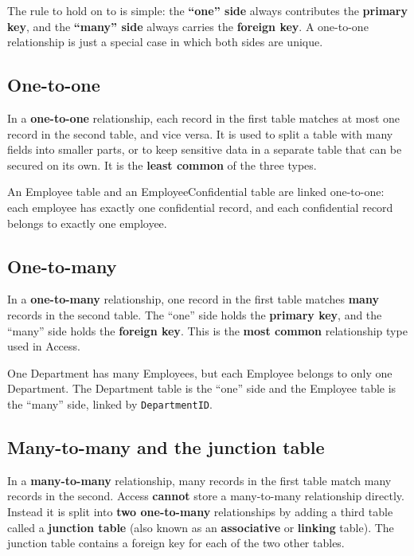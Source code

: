The rule to hold on to is simple: the \textbf{``one'' side} always contributes
the \textbf{primary key}, and the \textbf{``many'' side} always carries the
\textbf{foreign key}. A one-to-one relationship is just a special case in
which both sides are unique.

\subsection{One-to-one}
In a \textbf{one-to-one} relationship, each record in the first table matches
at most one record in the second table, and vice versa. It is used to split a
table with many fields into smaller parts, or to keep sensitive data in a
separate table that can be secured on its own. It is the \textbf{least common}
of the three types.

\begin{example}
An Employee table and an EmployeeConfidential table are linked one-to-one:
each employee has exactly one confidential record, and each confidential
record belongs to exactly one employee.
\end{example}

\subsection{One-to-many}
In a \textbf{one-to-many} relationship, one record in the first table matches
\textbf{many} records in the second table. The ``one'' side holds the
\textbf{primary key}, and the ``many'' side holds the \textbf{foreign key}.
This is the \textbf{most common} relationship type used in Access.

\begin{example}
One Department has many Employees, but each Employee belongs to only one
Department. The Department table is the ``one'' side and the Employee table is
the ``many'' side, linked by \texttt{DepartmentID}.
\end{example}

\subsection{Many-to-many and the junction table}
In a \textbf{many-to-many} relationship, many records in the first table match
many records in the second. Access \textbf{cannot} store a many-to-many
relationship directly. Instead it is split into \textbf{two one-to-many}
relationships by adding a third table called a \textbf{junction table} (also
known as an \textbf{associative} or \textbf{linking} table). The junction
table contains a foreign key for each of the two other tables.

